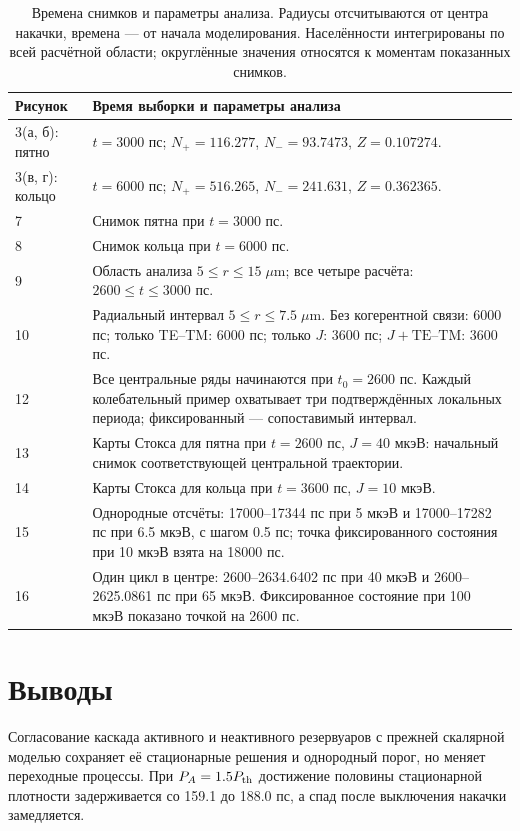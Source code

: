 \documentclass[12pt,a4paper]{article}
\begin{document}
\clearpage
\begingroup\footnotesize\setlength{\tabcolsep}{5pt}\renewcommand{\arraystretch}{1.2}
\begin{longtable}{@{}p{}p{}@{}}
\caption{Времена снимков и параметры анализа. Радиусы отсчитываются от центра накачки, времена --- от начала моделирования. Населённости интегрированы по всей расчётной области; округлённые значения относятся к моментам показанных снимков.}\label{tab:sampling}\\
\toprule
Рисунок & Время выборки и параметры анализа\\
\midrule
3(а, б): пятно & \(t=3000\) пс; \(N_+=116.277\), \(N_-=93.7473\), \(Z=0.107274\).\\
3(в, г): кольцо & \(t=6000\) пс; \(N_+=516.265\), \(N_-=241.631\), \(Z=0.362365\).\\
7 & Снимок пятна при \(t=3000\) пс.\\
8 & Снимок кольца при \(t=6000\) пс.\\
9 & Область анализа \(5\le r\le15\;\mu\mathrm m\); все четыре расчёта: \(2600\le t\le3000\) пс.\\
10 & Радиальный интервал \(5\le r\le7.5\;\mu\mathrm m\). Без когерентной связи: 6000 пс; только TE--TM: 6000 пс; только \(J\): 3600 пс; \(J+\mathrm{TE\text{–}TM}\): 3600 пс.\\
12 & Все центральные ряды начинаются при \(t_0=2600\) пс. Каждый колебательный пример охватывает три подтверждённых локальных периода; фиксированный --- сопоставимый интервал.\\
13 & Карты Стокса для пятна при \(t=2600\) пс, \(J=40\) мкэВ: начальный снимок соответствующей центральной траектории.\\
14 & Карты Стокса для кольца при \(t=3600\) пс, \(J=10\) мкэВ.\\
15 & Однородные отсчёты: 17000--17344 пс при 5 мкэВ и 17000--17282 пс при 6.5 мкэВ, с шагом 0.5 пс; точка фиксированного состояния при 10 мкэВ взята на 18000 пс.\\
16 & Один цикл в центре: 2600--2634.6402 пс при 40 мкэВ и 2600--2625.0861 пс при 65 мкэВ. Фиксированное состояние при 100 мкэВ показано точкой на 2600 пс.\\
\bottomrule
\end{longtable}
\endgroup

\section*{Выводы}

Согласование каскада активного и неактивного резервуаров с прежней скалярной моделью сохраняет её стационарные решения и однородный порог, но меняет переходные процессы. При \(P_A=1.5P_{\rm th}\) достижение половины стационарной плотности задерживается со 159.1 до 188.0 пс, а спад после выключения накачки замедляется.
\end{document}
